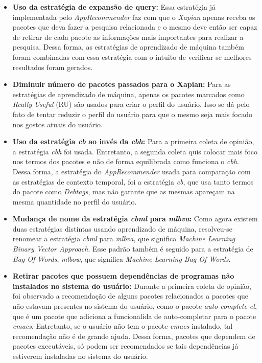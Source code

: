 \begin{itemize}
   \item \textbf{Uso da estratégia de expansão de query: } Essa estratégia já
   implementada pelo \textit{AppRecommender} faz com que o \textit{Xapian}
   apenas receba os pacotes que deva fazer a pesquisa relacionada e o mesmo deve
   então ser capaz de retirar de cada pacote as informações mais importantes
   para realizar a pesquisa. Dessa forma, as estratégias de aprendizado de
   máquina também foram combinadas com essa estratégia com o intuito de
   verificar se melhores resultados foram gerados.

   \item \textbf{Diminuir número de pacotes passados para o Xapian:} Para as
   estratégias de aprendizado de máquina, apenas os pacotes marcados como
   \textit{Really Useful} (RU) são usados para criar o perfil do
   usuário. Isso se dá pelo fato de tentar reduzir o perfil do usuário para
   que o mesmo seja mais focado nos gostos atuais do usuário.

   \item \textbf{Uso da estratégia \textit{cb} ao invés da \textit{cbh}:} Para
   a primeira coleta de opinião, a estratégia \textit{cbh} foi usada. Entretanto,
   a segunda coleta quis colocar mais foco nos termos dos pacotes e
   não de forma equilibrada como funciona o \textit{cbh}. Dessa forma,
   a estratégia do \textit{AppRecommender} usada para comparação com as
   estratégias de contexto temporal, foi a estratégia \textit{cb}, que usa
   tanto termos do pacote como \textit{Debtags}, mas não garante que as mesmas
   apareçam na mesma quantidade no perfil do usuário.

   \item \textbf{Mudança de nome da estratégia \textit{cbml} para
   \textit{mlbva}:} Como agora existem duas estratégias distintas usando
   aprendizado de máquina, resolveu-se renomear a estratégia \textit{cbml}
   para \textit{mlbva}, que significa \textit{Machine Learning Binary
   Vector Approach}. Esse padrão também é seguido para a estratégia de
   \textit{Bag Of Words}, \textit{mlbow}, que significa \textit{Machine
   Learning Bag Of Words}.

   \item \textbf{Retirar pacotes que possuem dependências de programas não
   instalados no sistema do usuário:} Durante a primeira coleta de opinião, foi
   observado a recomendação de alguns pacotes relacionados a pacotes que não
   estavam presentes no sistema do usuário, como o pacote
   \textit{auto-complete-el}, que é um pacote que adiciona a funcionalida
   de auto-completar para o pacote \textit{emacs}. Entretanto, se o usuário
   não tem o pacote \textit{emacs} instalado, tal recomendação não é de
   grande ajuda. Dessa forma, pacotes que dependem de pacotes executáveis,
   só podem ser recomendados se tais dependências já estiverem instaladas
   no sistema do usuário.

\end{itemize}

